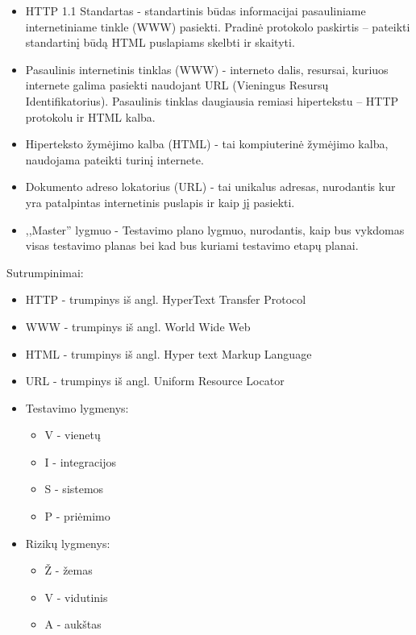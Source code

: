 \documentclass{VUMIFPSkursinis}
\begin{document}
    \begin{itemize}
    	\item HTTP 1.1 Standartas - standartinis būdas informacijai pasauliniame internetiniame tinkle (WWW) pasiekti. 
    		  Pradinė protokolo paskirtis – pateikti standartinį būdą HTML puslapiams skelbti ir skaityti.
    	\item Pasaulinis internetinis tinklas (WWW) - interneto dalis, resursai, kuriuos internete galima pasiekti naudojant URL (Vieningus Resursų Identifikatorius).
    		  Pasaulinis tinklas daugiausia remiasi hipertekstu – HTTP protokolu ir HTML kalba.
    	\item Hiperteksto žymėjimo kalba (HTML) - tai kompiuterinė žymėjimo kalba, naudojama pateikti turinį internete.
    	\item Dokumento adreso lokatorius (URL) - tai unikalus adresas, nurodantis kur yra patalpintas internetinis puslapis ir kaip jį pasiekti.
    	\item ,,Master'' lygmuo - Testavimo plano lygmuo, nurodantis, kaip bus vykdomas visas testavimo planas bei kad bus kuriami testavimo etapų planai.
    
    \end{itemize}

    Sutrumpinimai:

    \begin{itemize}
    	\item HTTP - trumpinys iš angl. HyperText Transfer Protocol
    	\item WWW - trumpinys iš angl. World Wide Web
    	\item HTML - trumpinys iš angl. Hyper text Markup Language
    	\item URL - trumpinys iš angl. Uniform Resource Locator
    	\item Testavimo lygmenys:
    		\begin{itemize}
    			\item V - vienetų
    			\item I - integracijos
    			\item S - sistemos
    			\item P - priėmimo
    		\end{itemize}
    	\item Rizikų lygmenys:
    		\begin{itemize}
    			\item Ž - žemas
    			\item V - vidutinis
    			\item A - aukštas
    		\end{itemize}
    \end{itemize}

  
\end{document}

